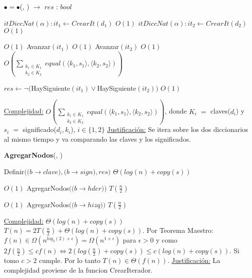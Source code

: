 \begin{algorithm}[H]{\textbf{$\bullet = \bullet$}(, ) $\to$ $res$ : $bool$}
	\begin{algorithmic}

		\State $itDiccNat(\alpha): it_1 \gets CrearIt(d_1)$ \Comment $O(1)$
		\State $itDiccNat(\alpha): it_2 \gets CrearIt(d_2)$ \Comment $O(1)$

		 \Comment $O(1)$
			\State Avanzar$(it_1)$ \Comment $O(1)$
			\State Avanzar$(it_2)$ \Comment $O(1)$
		\EndWhile \Comment $\displaystyle O\left(\sum_{\substack{k_1 \in K_1\\k_2\in K_2}}equal(\langle k_1,s_1\rangle, \langle k_2, s_2 \rangle)\right)$

		\State $res \gets \neg ($HaySiguiente$(it_1) \lor $HaySiguiente$(it_2))$ \Comment $O(1)$

		\medskip
		\Statex \underline{Complejidad:} $\displaystyle O\left(\sum_{\substack{k_1 \in K_1\\k_2\in K_2}}equal(\langle k_1,s_1\rangle, \langle k_2, s_2 \rangle)\right)$, donde $K_i$ $=$ claves($d_i$) y $s_i$ $=$ significado($d_i, k_i$), $i \in \{1,2\}$
		\Statex \underline{Justificación:} Se itera sobre los dos diccionarios al mismo tiempo y va comparando las claves y los significados.

    \end{algorithmic}
\end{algorithm}


\begin{algorithm}[H]{\textbf{AgregarNodos}(, )}
	\begin{algorithmic}

		\State Definir$((b$$\rightarrow$$clave), (b$$\rightarrow$$sign), res)$ \Comment $\Theta(log(n) + copy(s))$

		 \Comment $O(1)$
			\State AgregarNodos$((b$$\rightarrow$$hder))$ \Comment $T(\frac{n}{2})$
		\EndIf

		 \Comment $O(1)$
			\State AgregarNodos$((b$$\rightarrow$$hizq))$ \Comment $T(\frac{n}{2})$
		\EndIf 


		\medskip
		\Statex \underline{Complejidad:} $\Theta(log(n) + copy(s))$ \\
		$T(n) = 2T(\frac{n}{2}) + \Theta(log(n) + copy(s))$. Por Teorema Maestro: $f(n) \in \Omega(n^{log_2(2) + \epsilon}) = \Omega(n^{1 + \epsilon})$ para $\epsilon > 0$ y como $2f(\frac{n}{2}) \leq cf(n) \Leftrightarrow 2(log(\frac{n}{2}) + copy(s)) \leq c(log(n) + copy(s))$. Si tomo $c > 2$ cumple. Por lo tanto $T(n) \in \Theta(f(n))$.
		\Statex \underline{Justificación:} La complejidad proviene de la funcion CrearIterador.

    \end{algorithmic}
\end{algorithm}


